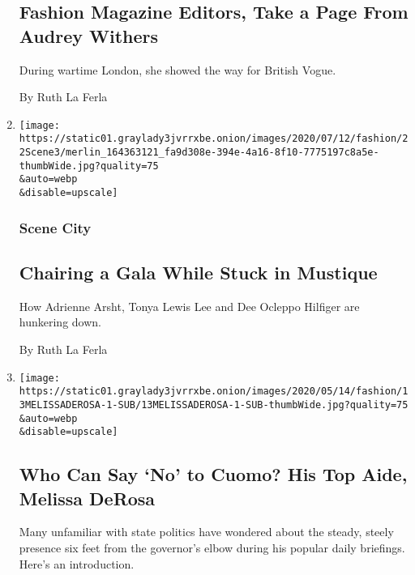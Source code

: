 \begin{enumerate}
  \hypertarget{fashion-magazine-editors-take-a-page-from-audrey-withers}{%
  \subsection{Fashion Magazine Editors, Take a Page From Audrey
  Withers}\label{fashion-magazine-editors-take-a-page-from-audrey-withers}}

  During wartime London, she showed the way for British Vogue.

  By Ruth La Ferla
\item
  \href{/2020/05/25/style/chairing-a-gala-while-stuck-in-mustique.html}{}

  \texttt{[image: https://static01.graylady3jvrrxbe.onion/images/2020/07/12/fashion/22Scene3/merlin\_164363121\_fa9d308e-394e-4a16-8f10-7775197c8a5e-thumbWide.jpg?quality=75\\\&auto=webp\\\&disable=upscale]}

  \hypertarget{scene-city-1}{%
  \subsubsection{Scene City}\label{scene-city-1}}

  \hypertarget{chairing-a-gala-while-stuck-in-mustique}{%
  \subsection{Chairing a Gala While Stuck in
  Mustique}\label{chairing-a-gala-while-stuck-in-mustique}}

  How Adrienne Arsht, Tonya Lewis Lee and Dee Ocleppo Hilfiger are
  hunkering down.

  By Ruth La Ferla
\item
  \href{/article/who-is-melissa-derosa.html}{}

  \texttt{[image: https://static01.graylady3jvrrxbe.onion/images/2020/05/14/fashion/13MELISSADEROSA-1-SUB/13MELISSADEROSA-1-SUB-thumbWide.jpg?quality=75\\\&auto=webp\\\&disable=upscale]}

  \hypertarget{who-can-say-no-to-cuomo-his-top-aide-melissa-derosa}{%
  \subsection{Who Can Say `No' to Cuomo? His Top Aide, Melissa
  DeRosa}\label{who-can-say-no-to-cuomo-his-top-aide-melissa-derosa}}

  Many unfamiliar with state politics have wondered about the steady,
  steely presence six feet from the governor's elbow during his popular
  daily briefings. Here's an introduction.


\end{enumerate}
